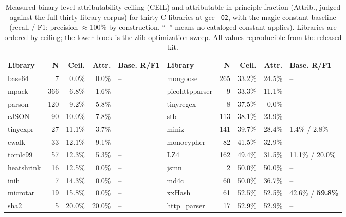 \documentclass[conference]{IEEEtran}
\begin{document}
\begin{table}[t]
\caption{Measured binary-level attributability ceiling (CEIL) and attributable-in-principle
fraction (Attrib., judged against the full thirty-library corpus) for thirty C libraries at
gcc \texttt{-O2}, with the magic-constant baseline (recall / F1; precision $\approx$100\% by
construction, ``--'' means no cataloged constant applies). Libraries are ordered by ceiling;
the lower block is the zlib optimization sweep. All values reproducible from the released kit.}
\label{tab:ceiling}
\centering
\scriptsize
\renewcommand{\arraystretch}{0.98}
\setlength{\tabcolsep}{2.5pt}
\begin{tabular}{lrrr@{\hskip 4pt}l@{\hskip 10pt}lrrr@{\hskip 4pt}l}
\toprule
\textbf{Library} & \textbf{N} & \textbf{Ceil.} & \textbf{Attr.} & \textbf{Base. R/F1} &
\textbf{Library} & \textbf{N} & \textbf{Ceil.} & \textbf{Attr.} & \textbf{Base. R/F1} \\
\midrule
base64       & 7   & 0.0\%  & 0.0\%  & --              & mongoose       & 265 & 33.2\% & 24.5\% & -- \\
mpack        & 366 & 6.8\%  & 1.6\%  & --              & picohttpparser & 9   & 33.3\% & 11.1\% & -- \\
parson       & 120 & 9.2\%  & 5.8\%  & --              & tinyregex      & 8   & 37.5\% & 0.0\%  & -- \\
cJSON        & 90  & 10.0\% & 7.8\%  & --              & stb            & 113 & 38.1\% & 23.9\% & -- \\
tinyexpr     & 27  & 11.1\% & 3.7\%  & --              & miniz          & 141 & 39.7\% & 28.4\% & 1.4\% / 2.8\% \\
cwalk        & 33  & 12.1\% & 9.1\%  & --              & monocypher     & 82  & 41.5\% & 32.9\% & -- \\
tomlc99      & 57  & 12.3\% & 5.3\%  & --              & LZ4            & 162 & 49.4\% & 31.5\% & 11.1\% / 20.0\% \\
heatshrink   & 16  & 12.5\% & 0.0\%  & --              & jsmn           & 2   & 50.0\% & 50.0\% & -- \\
inih         & 7   & 14.3\% & 0.0\%  & --              & md4c           & 60  & 50.0\% & 36.7\% & -- \\
microtar     & 19  & 15.8\% & 0.0\%  & --              & xxHash         & 61  & 52.5\% & 52.5\% & 42.6\% / \textbf{59.8\%} \\
sha2         & 5   & 20.0\% & 20.0\% & --              & http\_parser   & 17  & 52.9\% & 52.9\% & -- \\

\end{tabular}
\end{table}
\end{document}
